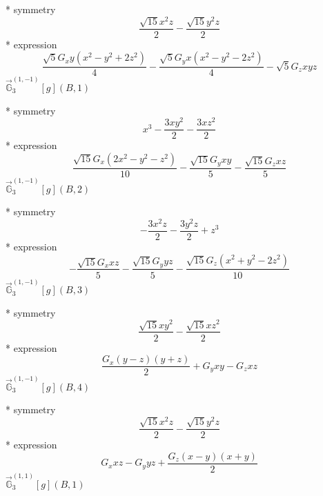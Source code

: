 \documentclass[fleqn,8pt]{jsarticle}
\begin{document}
\noindent\quad ** symmetry
\begin{dmath*}
\frac{\sqrt{15} x^{2} z}{2} - \frac{\sqrt{15} y^{2} z}{2}
\end{dmath*}
\noindent\quad ** expression
\begin{dmath*}
\frac{\sqrt{5} G_{x} y \left(x^{2} - y^{2} + 2 z^{2}\right)}{4} - \frac{\sqrt{5} G_{y} x \left(x^{2} - y^{2} - 2 z^{2}\right)}{4} - \sqrt{5} G_{z} x y z
\end{dmath*}
\noindent\quad $\vec{\mathbb{G}}_{3}^{(1,-1)}[g](B,1)$

\noindent\quad ** symmetry
\begin{dmath*}
x^{3} - \frac{3 x y^{2}}{2} - \frac{3 x z^{2}}{2}
\end{dmath*}
\noindent\quad ** expression
\begin{dmath*}
\frac{\sqrt{15} G_{x} \left(2 x^{2} - y^{2} - z^{2}\right)}{10} - \frac{\sqrt{15} G_{y} x y}{5} - \frac{\sqrt{15} G_{z} x z}{5}
\end{dmath*}
\noindent\quad $\vec{\mathbb{G}}_{3}^{(1,-1)}[g](B,2)$

\noindent\quad ** symmetry
\begin{dmath*}
- \frac{3 x^{2} z}{2} - \frac{3 y^{2} z}{2} + z^{3}
\end{dmath*}
\noindent\quad ** expression
\begin{dmath*}
- \frac{\sqrt{15} G_{x} x z}{5} - \frac{\sqrt{15} G_{y} y z}{5} - \frac{\sqrt{15} G_{z} \left(x^{2} + y^{2} - 2 z^{2}\right)}{10}
\end{dmath*}
\noindent\quad $\vec{\mathbb{G}}_{3}^{(1,-1)}[g](B,3)$

\noindent\quad ** symmetry
\begin{dmath*}
\frac{\sqrt{15} x y^{2}}{2} - \frac{\sqrt{15} x z^{2}}{2}
\end{dmath*}
\noindent\quad ** expression
\begin{dmath*}
\frac{G_{x} \left(y - z\right) \left(y + z\right)}{2} + G_{y} x y - G_{z} x z
\end{dmath*}
\noindent\quad $\vec{\mathbb{G}}_{3}^{(1,-1)}[g](B,4)$

\noindent\quad ** symmetry
\begin{dmath*}
\frac{\sqrt{15} x^{2} z}{2} - \frac{\sqrt{15} y^{2} z}{2}
\end{dmath*}
\noindent\quad ** expression
\begin{dmath*}
G_{x} x z - G_{y} y z + \frac{G_{z} \left(x - y\right) \left(x + y\right)}{2}
\end{dmath*}
\noindent\quad $\vec{\mathbb{G}}_{3}^{(1,1)}[g](B,1)$
\end{document}
